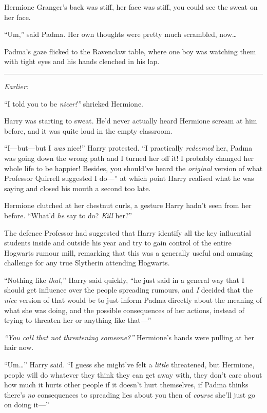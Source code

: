 Hermione Granger's back was stiff, her face was stiff, you could see the
sweat on her face.

``Um,'' said Padma. Her own thoughts were pretty much scrambled,
now\ldots{}

Padma's gaze flicked to the Ravenclaw table, where one boy was watching
them with tight eyes and his hands clenched in his lap.

\begin{center}\rule{3in}{0.4pt}\end{center}

\emph{Earlier:}

``I told you to be \emph{nicer!''} shrieked Hermione.

Harry was starting to sweat. He'd never actually heard Hermione scream
at him before, and it was quite loud in the empty classroom.

``I---but---but I \emph{was} nice!'' Harry protested. ``I practically
\emph{redeemed} her, Padma was going down the wrong path and I turned
her off it! I probably changed her whole life to be happier! Besides,
you should've heard the \emph{original} version of what Professor
Quirrell suggested I do---'' at which point Harry realised what he was
saying and closed his mouth a second too late.

Hermione clutched at her chestnut curls, a gesture Harry hadn't seen
from her before. ``What'd \emph{he} say to do? \emph{Kill} her?''

The defence Professor had suggested that Harry identify all the key
influential students inside and outside his year and try to gain control
of the entire Hogwarts rumour mill, remarking that this was a generally
useful and amusing challenge for any true Slytherin attending Hogwarts.

``Nothing like \emph{that,}'' Harry said quickly, ``he just said in a
general way that I should get influence over the people spreading
rumours, and \emph{I} decided that the \emph{nice} version of that would
be to just inform Padma directly about the meaning of what she was
doing, and the possible consequences of her actions, instead of trying
to threaten her or anything like that---''

\emph{``You call that not threatening someone?''} Hermione's hands were
pulling at her hair now.

``Um\ldots{}'' Harry said. ``I guess she might've felt a \emph{little}
threatened, but Hermione, people will do whatever they think they can
get away with, they don't care about how much it hurts other people if
it doesn't hurt themselves, if Padma thinks there's \emph{no}
consequences to spreading lies about you then of \emph{course} she'll
just go on doing it---''

